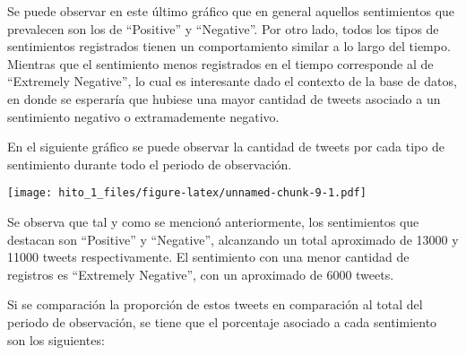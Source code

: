 \documentclass[
]{article}
\newenvironment{Shaded}{\begin{snugshade}}{\end{snugshade}}
\newcommand{\CommentTok}[1]{\textcolor[rgb]{0.56,0.35,0.01}{\textit{#1}}}
\newcommand{\DataTypeTok}[1]{\textcolor[rgb]{0.13,0.29,0.53}{#1}}
\newcommand{\KeywordTok}[1]{\textcolor[rgb]{0.13,0.29,0.53}{\textbf{#1}}}
\newcommand{\NormalTok}[1]{#1}
\newcommand{\OperatorTok}[1]{\textcolor[rgb]{0.81,0.36,0.00}{\textbf{#1}}}
\newcommand{\StringTok}[1]{\textcolor[rgb]{0.31,0.60,0.02}{#1}}
\begin{document}
Se puede observar en este último gráfico que en general aquellos
sentimientos que prevalecen son los de ``Positive'' y ``Negative''. Por
otro lado, todos los tipos de sentimientos registrados tienen un
comportamiento similar a lo largo del tiempo. Mientras que el
sentimiento menos registrados en el tiempo corresponde al de ``Extremely
Negative'', lo cual es interesante dado el contexto de la base de datos,
en donde se esperaría que hubiese una mayor cantidad de tweets asociado
a un sentimiento negativo o extramademente negativo.

En el siguiente gráfico se puede observar la cantidad de tweets por cada
tipo de sentimiento durante todo el periodo de observación.

\begin{Shaded}
\end{Shaded}

\texttt{[image: hito\_1\_files/figure-latex/unnamed-chunk-9-1.pdf]}

Se observa que tal y como se mencionó anteriormente, los sentimientos
que destacan son ``Positive'' y ``Negative'', alcanzando un total
aproximado de 13000 y 11000 tweets respectivamente. El sentimiento con
una menor cantidad de registros es ``Extremely Negative'', con un
aproximado de 6000 tweets.

Si se comparación la proporción de estos tweets en comparación al total
del periodo de observación, se tiene que el porcentaje asociado a cada
sentimiento son los siguientes:

\begin{Shaded}
\end{Shaded}
\end{document}
